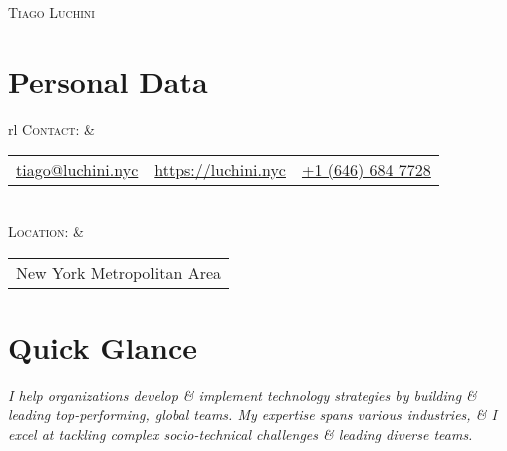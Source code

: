 \documentclass[a4paper,10pt]{article}
\begin{document}
\pagestyle{empty} %

\par{\centering
  {\Huge \textsc{Tiago Luchini}}\bigskip\par}

\section{Personal Data}

\begin{tabular}{rl}
  \textsc{Contact:} & \begin{tabular}{lll}
    \href{mailto:tiago@luchini.nyc}{tiago@luchini.nyc} &
    \href{https://luchini.nyc}{https://luchini.nyc} &
    \href{tel:+16466847728}{+1 (646) 684 7728}
  \end{tabular}\\

  \textsc{Location:} & \begin{tabular}{l}
    New York Metropolitan Area
  \end{tabular}
\end{tabular}

\section{Quick Glance}
\emph{I help organizations develop \& implement technology strategies
by building \& leading top-performing, global teams. My expertise
spans various industries, \& I excel at tackling complex
socio-technical challenges \& leading diverse teams.}

\end{document}
